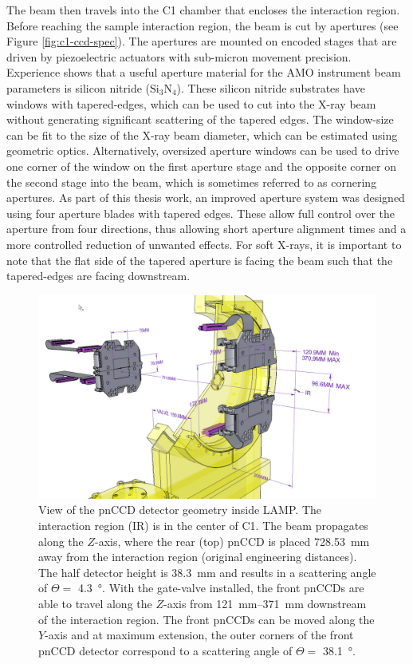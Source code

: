 The beam then travels into the C1 chamber that encloses the interaction region. Before reaching the sample interaction region, the beam is cut by apertures (see Figure \ref{fig:c1-ccd-spec}). The apertures are mounted on encoded stages that are driven by piezoelectric actuators with sub-micron movement precision. Experience shows that a useful aperture material for the AMO instrument beam parameters is silicon nitride ($\text{Si}_{3}\text{N}_{4}$). These silicon nitride substrates have windows with tapered-edges, which can be used to cut into the X-ray beam without generating significant scattering of the tapered edges. The window-size can be fit to the size of the X-ray beam diameter, which can be estimated using geometric optics. Alternatively, oversized aperture windows can be used to drive one corner of the window on the first aperture stage and the opposite corner on the second stage into the beam, which is sometimes referred to as cornering apertures. As part of this thesis work, an improved aperture system was designed using four aperture blades with tapered edges. These allow full control over the aperture from four directions, thus allowing short aperture alignment times and a more controlled reduction of unwanted effects. For soft X-rays, it is important to note that the flat side of the tapered aperture is facing the beam such that the tapered-edges are facing downstream.\\[1\baselineskip]
\begin{figure}
	\centering
		\includegraphics[width=1.0\textwidth]{images/pnCCD-dimensions.jpg}
	\caption[pnCCD detector geometry in the LAMP instrument.]{View of the pnCCD detector geometry inside LAMP. The interaction region (IR) is in the center of C1. The beam propagates along the $Z$-axis, where the rear (top) pnCCD is placed \SI{728.53}{\milli\meter} away from the interaction region (original engineering distances). The half detector height is \SI{38.3}{\milli\meter} and results in a scattering angle of $\Theta =$ \SI{4.3}{\degree}. With the gate-valve installed, the front pnCCDs are able to travel along the $Z$-axis from \SIrange{121}{371}{\milli\meter} downstream of the interaction region. The front pnCCDs can be moved along the $Y$-axis and at maximum extension, the outer corners of the front pnCCD detector correspond to a scattering angle of $\Theta=$ \SI{38.1}{\degree}.}
	\label{fig:pnCCD-dimensions}
\end{figure}
